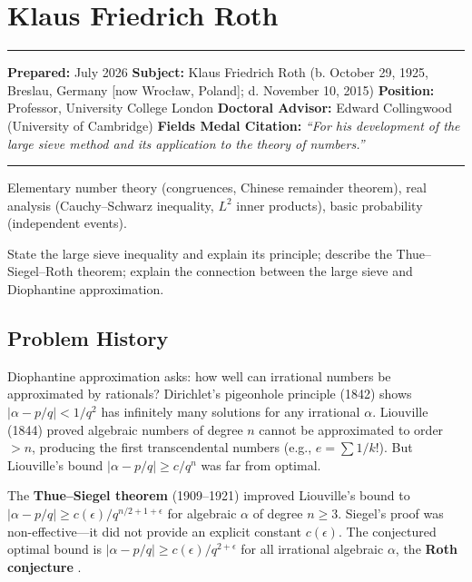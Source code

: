 \chapter{Klaus Friedrich Roth}\label{ch1958klausfriedrichroth:klaus-friedrich-roth-fields-medal-1958-a-comprehensive-report}

\begin{center}\rule{0.5\linewidth}{0.5pt}\end{center}

\textbf{Prepared:} July 2026 \textbf{Subject:} Klaus Friedrich Roth (b.
October 29, 1925, Breslau, Germany [now Wroc\l{}aw, Poland]; d.
November 10, 2015) \textbf{Position:} Professor, University College London
\textbf{Doctoral Advisor:} Edward Collingwood (University of Cambridge)
\textbf{Fields Medal Citation:} \emph{``For his development of the large
sieve method and its application to the theory of numbers.'' }

\begin{center}\rule{0.5\linewidth}{0.5pt}\end{center}

\begin{prereqs} Elementary number theory (congruences, Chinese remainder theorem), real analysis (Cauchy--Schwarz inequality, $L^2$ inner products), basic probability (independent events). \end{prereqs}

\begin{objectives} State the large sieve inequality and explain its principle; describe the Thue--Siegel--Roth theorem; explain the connection between the large sieve and Diophantine approximation. \end{objectives}

\section{Problem History}

Diophantine approximation asks: how well can irrational numbers be approximated
by rationals? Dirichlet's pigeonhole principle (1842) shows $|\alpha - p/q| <
1/q^2$ has infinitely many solutions for any irrational $\alpha$. Liouville
(1844) proved algebraic numbers of degree $n$ cannot be approximated to order
$> n$, producing the first transcendental numbers (e.g., $e = \sum 1/k!$). But
Liouville's bound $|\alpha - p/q| \geq c/q^n$ was far from optimal.

The \textbf{Thue--Siegel theorem} (1909--1921) improved Liouville's bound to
$|\alpha - p/q| \geq c(\epsilon)/q^{n/2 + 1 + \epsilon}$ for algebraic
$\alpha$ of degree $n \geq 3$. Siegel's proof was non-effective---it did not
provide an explicit constant $c(\epsilon)$. The conjectured optimal bound is
$|\alpha - p/q| \geq c(\epsilon)/q^{2+\epsilon}$ for all irrational algebraic
$\alpha$, the \textbf{Roth conjecture} \cite{roth1955}.

